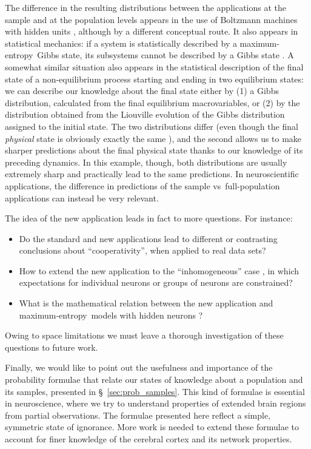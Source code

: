 \documentclass[\ifafour a4paper,12pt,\else a5paper,10pt,\fi%
onecolumn,oneside,article,%
british%
]{memoir}
\theoremstyle{remark}
\theoremstyle{innote}
\newcommand*{\citep}{\parencites}
\renewcommand*{\|}{\nonscript\,\vert\nonscript\;\mathopen{}}
\newcommand*{\sect}{\S}%
\newcommand*{\vs}{{vs}}
\newcommand*{\cf}{{cf.}}
\newcommand*{\me}{maximum-entropy}
\begin{document}
The difference in the resulting distributions between the applications at
the sample and at the population levels appears in the use of Boltzmann
machines with hidden units \citep{lerouxetal2008}, although by a different
conceptual route. It also appears in statistical mechanics: if a system is
statistically described by a \me\ Gibbs state, its subsystems cannot be
described by a Gibbs state \citep{maesetal1999}. A somewhat similar
situation also appears in the statistical description of the final state of
a non-equilibrium process starting and ending in two equilibrium states: we
can describe our knowledge about the final state either by (1) a Gibbs
distribution, calculated from the final equilibrium macrovariables, or (2)
by the distribution obtained from the Liouville evolution of the Gibbs
distribution assigned to the initial state. The two distributions differ
(even though the final \emph{physical} state is obviously exactly the same
\citep[\sect~4]{jaynes1985d_r1993}), and the second allows us to make
sharper predictions about the final physical state thanks to our knowledge
of its preceding dynamics. In this example, though, both distributions are
usually extremely sharp and practically lead to the same predictions. In
neuroscientific applications, the difference in predictions of the sample
\vs\ full-population applications can instead be very relevant.

The idea of the new application leads in fact to more questions. For
instance:
\begin{itemize}
\item Do the standard and new applications lead to different or contrasting
  conclusions about \enquote{cooperativity}, when applied to real data
  sets?
\item How to extend the new application to the \enquote{inhomogeneous} case
  \citep{schneidmanetal2006,shlensetal2006,roudietal2009b}, in which
  expectations for individual neurons or groups of neurons are constrained?
\item What is the mathematical relation between the new application and
  \me\ models with hidden neurons
  \citep{smolensky1986,kulkarnietal2007,huang2015,dunnetal2017}?
\end{itemize}
Owing to space limitations we must leave a thorough investigation of these
questions to future work.

Finally, we would like to point out the usefulness and importance of the
probability formulae that relate our states of knowledge about a population
and its samples, presented in \sect~\ref{sec:prob_samples}. This kind of
formulae is essential in neuroscience, where we try to understand
properties of extended brain regions from partial observations. The
formulae presented here reflect a simple, symmetric state of ignorance.
More work is needed \citep[\cf][]{levinaetal2017} to extend these formulae
to account for finer knowledge of the cerebral cortex and its network
properties.
\end{document}
